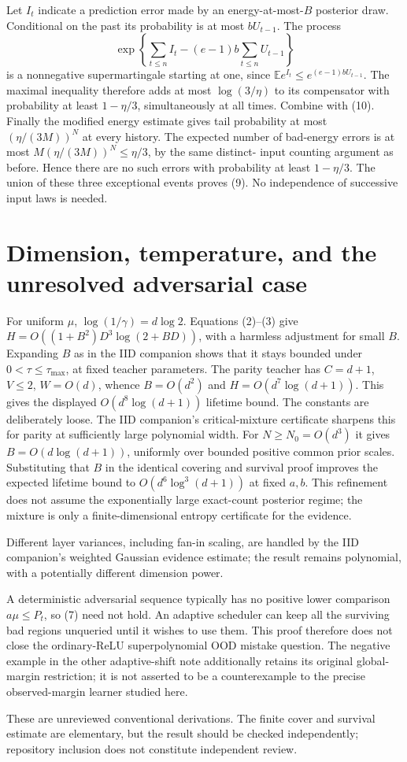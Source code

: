 \documentclass[11pt]{article}
\newcommand{\E}{\mathbb E}\newcommand{\R}{\mathbb R}
\begin{document}
Let $I_t$ indicate a prediction error made by an energy-at-most-$B$
posterior draw. Conditional on the past its probability is at most
$bU_{t-1}$. The process
\[
 \exp\left\{\sum_{t\le n}I_t
                       -(e-1)b\sum_{t\le n}U_{t-1}\right\}
\]
is a nonnegative supermartingale starting at one, since
$\E e^{I_t}\le e^{(e-1)bU_{t-1}}$. The maximal inequality therefore
adds at most $\log(3/\eta)$ to its compensator with probability at
least $1-\eta/3$, simultaneously at all times. Combine with (10).
Finally the modified energy estimate gives tail probability at most
$(\eta/(3M))^N$ at every history. The expected number of bad-energy
errors is at most $M(\eta/(3M))^N\le\eta/3$, by the same distinct-
input counting argument as before. Hence there are no such errors with
probability at least $1-\eta/3$. The union of these three exceptional
events proves (9). No independence of successive input laws is needed.

\section{Dimension, temperature, and the unresolved adversarial case}
For uniform $\mu$, $\log(1/\gamma)=d\log2$. Equations (2)--(3) give
$H=O((1+B^2)D^3\log(2+BD))$, with a harmless adjustment for small $B$.
Expanding $B$ as in the IID companion shows that it stays bounded under
$0<\tau\le\tau_{\max}$, at fixed teacher parameters. The parity teacher
has $C=d+1$, $V\le2$, $W=O(d)$, whence $B=O(d^2)$ and
$H=O(d^7\log(d+1))$. This gives the displayed $O(d^8\log(d+1))$
lifetime bound. The constants are deliberately loose.
The IID companion's critical-mixture certificate sharpens this for parity
at sufficiently large polynomial width. For $N\ge N_0=O(d^3)$ it gives
$B=O(d\log(d+1))$, uniformly over bounded positive common prior scales.
Substituting that $B$ in the identical covering and survival proof improves
the expected lifetime bound to $O(d^6\log^3(d+1))$ at fixed $a,b$.
This refinement does not assume the exponentially large exact-count
posterior regime; the mixture is only a finite-dimensional entropy
certificate for the evidence.

Different layer variances, including fan-in scaling, are handled by the
IID companion's weighted Gaussian evidence estimate; the result remains
polynomial, with a potentially different dimension power.

A deterministic adversarial sequence typically has no positive lower
comparison $a\mu\le P_t$, so (7) need not hold. An adaptive scheduler
can keep all the surviving bad regions unqueried until it wishes to use
them. This proof therefore does not close the ordinary-ReLU
superpolynomial OOD mistake question. The negative example in the other
adaptive-shift note additionally retains its original global-margin
restriction; it is not asserted to be a counterexample to the precise
observed-margin learner studied here.

These are unreviewed conventional derivations. The finite cover and
survival estimate are elementary, but the result should be checked
independently; repository inclusion does not constitute independent review.
\end{document}
